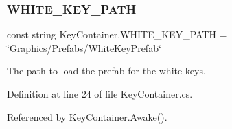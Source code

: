 \subsubsection{\texorpdfstring{W\+H\+I\+T\+E\+\_\+\+K\+E\+Y\+\_\+\+P\+A\+TH}{WHITE\_KEY\_PATH}}
{\footnotesize\ttfamily const string Key\+Container.\+W\+H\+I\+T\+E\+\_\+\+K\+E\+Y\+\_\+\+P\+A\+TH = \char`\"{}Graphics/Prefabs/White\+Key\+Prefab\char`\"{}\hspace{0.3cm}{\ttfamily [private]}}



The path to load the prefab for the white keys. 



Definition at line 24 of file Key\+Container.\+cs.



Referenced by Key\+Container.\+Awake().

